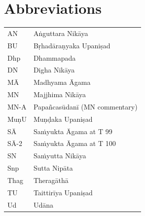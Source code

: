 \documentclass[10pt, openright]{book}
\begin{document}
\section{Abbreviations}
\bgroup
\def\arraystretch{1.2}
\begin{tabular}{ll}
AN & Aṅguttara Nikāya \\
BU & Bṛhadāraṇyaka Upaniṣad \\
Dhp & Dhammapada \\
DN & Digha Nikāya \\
MĀ & Madhyama Āgama \\
MN & Majjhima Nikāya \\
MN-A & Papañcasūdanī (MN commentary) \\
MuṇU & Muṇḍaka Upaniṣad \\
SĀ & Saṁyukta Āgama at T 99 \\
SĀ-2 & Saṁyukta Āgama at T 100 \\
SN & Saṁyutta Nikāya \\
Snp & Sutta Nipāta \\
Thag & Theragāthā \\
TU & Taittirīya Upaniṣad \\
Ud & Udāna \\

\end{tabular}\
\egroup





\end{document}
